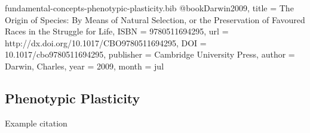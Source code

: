\begin{bibunit}

\begin{filecontents*}[overwrite]{fundamental-concepts-phenotypic-plasticity.bib}
@book{Darwin2009,
  title = {The Origin of Species: By Means of Natural Selection,  or the Preservation of Favoured Races in the Struggle for Life},
  ISBN = {9780511694295},
  url = {http://dx.doi.org/10.1017/CBO9780511694295},
  DOI = {10.1017/cbo9780511694295},
  publisher = {Cambridge University Press},
  author = {Darwin,  Charles},
  year = {2009},
  month = jul 
}
\end{filecontents*} 

\subsection{Phenotypic Plasticity}
\label{sec:phenotypic-plasticity}

Example citation \citep{Darwin2009}

    
\end{bibunit}
